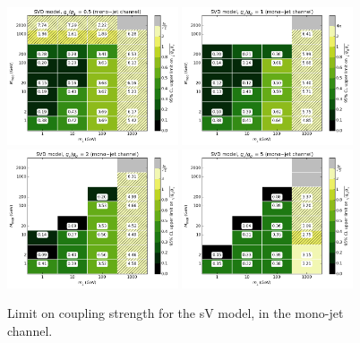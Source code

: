 \begin{figure}[!h]
\begin{center}
\includegraphics[width=0.45\textwidth]{figures/grid_basepoints_SVD_rat05_monojet.png}
\includegraphics[width=0.45\textwidth]{figures/grid_basepoints_SVD_rat1_monojet.png}
\includegraphics[width=0.45\textwidth]{figures/grid_basepoints_SVD_rat2_monojet.png}
\includegraphics[width=0.45\textwidth]{figures/grid_basepoints_SVD_rat5_monojet.png}
\caption{Limit on coupling strength for the sV model, in the mono-jet channel.}
\label{fig:Monojet_SVD_couplinglimit}
\end{center}
\end{figure}

